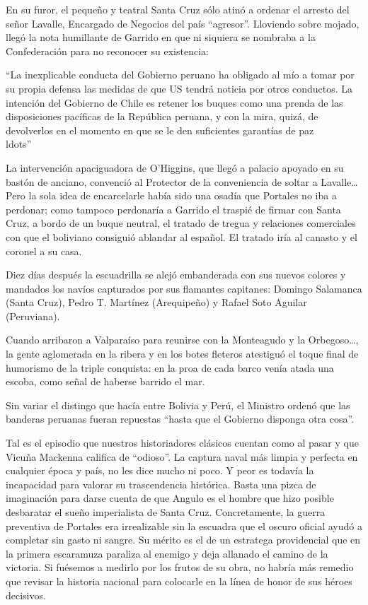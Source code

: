 \documentclass[10pt,twoside,openright]{memoir}
\begin{document}
En su furor, el pequeño y teatral Santa Cruz sólo atinó a ordenar el
arresto del señor Lavalle, Encargado de Negocios del país ``agresor''.
Lloviendo sobre mojado, llegó la nota humillante de Garrido en que ni
siquiera se nombraba a la Confederación para no reconocer su existencia:

``La inexplicable conducta del Gobierno peruano ha obligado al mío a
tomar por su propia defensa las medidas de que US tendrá noticia por
otros conductos. La intención del Gobierno de Chile es retener los
buques como una prenda de las disposiciones pacíficas de la República
peruana, y con la mira, quizá, de devolverlos en el momento en que se le
den suficientes garantías de paz\\ldots''

La intervención apaciguadora de O'Higgins, que llegó a palacio apoyado
en su bastón de anciano, convenció al Protector de la conveniencia de
soltar a Lavalle\ldots Pero la sola idea de encarcelarle había sido una
osadía que Portales no iba a perdonar; como tampoco perdonaría a Garrido
el traspié de firmar con Santa Cruz, a bordo de un buque neutral, el
tratado de tregua y relaciones comerciales con que el boliviano
consiguió ablandar al español. El tratado iría al canasto y el coronel a
su casa.

Diez días después la escuadrilla se alejó embanderada con sus nuevos
colores y mandados los navíos capturados por sus flamantes capitanes:
Domingo Salamanca (Santa Cruz), Pedro T. Martínez (Arequipeño) y Rafael
Soto Aguilar (Peruviana).

Cuando arribaron a Valparaíso para reunirse con la Monteagudo y la
Orbegoso\ldots, la gente aglomerada en la ribera y en los botes fleteros
atestiguó el toque final de humorismo de la triple conquista: en la proa
de cada barco venía atada una escoba, como señal de haberse barrido el
mar.

Sin variar el distingo que hacía entre Bolivia y Perú, el Ministro
ordenó que las banderas peruanas fueran repuestas ``hasta que el Gobierno
disponga otra cosa''.

Tal es el episodio que nuestros historiadores clásicos cuentan como al
pasar y que Vicuña Mackenna califica de ``odioso''. La captura naval más
limpia y perfecta en cualquier época y país, no les dice mucho ni poco.
Y peor es todavía la incapacidad para valorar su trascendencia
histórica. Basta una pizca de imaginación para darse cuenta de que
Angulo es el hombre que hizo posible desbaratar el sueño imperialista de
Santa Cruz. Concretamente, la guerra preventiva de Portales era
irrealizable sin la escuadra que el oscuro oficial ayudó a completar sin
gasto ni sangre. Su mérito es el de un estratega providencial que en la
primera escaramuza paraliza al enemigo y deja allanado el camino de la
victoria. Si fuésemos a medirlo por los frutos de su obra, no habría más
remedio que revisar la historia nacional para colocarle en la línea de
honor de sus héroes decisivos.
\end{document}
